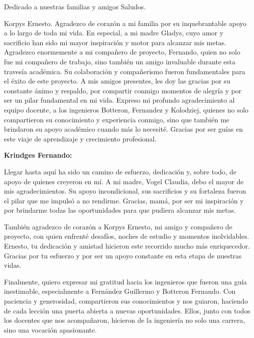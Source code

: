 

\begin{reconocimiento}{Dedicado a nuestras familias y amigos Saludos.}

Korpys Ernesto.
Agradezco de corazón a mi familia por su inquebrantable apoyo a lo largo de toda mi vida. En especial, a mi madre Gladys, cuyo amor y sacrificio han sido mi mayor inspiración y motor para alcanzar mis metas.
Agradezco enormemente a mi compañero de proyecto, Fernando, quien no solo fue mi compañero de trabajo, sino también un amigo invaluable durante esta travesía académica. Su colaboración y compañerismo fueron fundamentales para el éxito de este proyecto.
A mis amigos presentes, les doy las gracias por su constante ánimo y respaldo, por compartir conmigo momentos de alegría y por ser un pilar fundamental en mi vida.
Expreso mi profundo agradecimiento al equipo docente, a los ingenieros Botteron, Fernandez y Kolodziej, quienes no solo compartieron su conocimiento y experiencia conmigo, sino que también me brindaron su apoyo académico cuando más lo necesité. Gracias por ser guías en este viaje de aprendizaje y crecimiento profesional. \par 
\par 

\textbf{Krindges Fernando:} \par 
Llegar hasta aquí ha sido un camino de esfuerzo, dedicación y, sobre todo, de apoyo de quienes creyeron en mí. A mi madre, Vogel Claudia, debo el mayor de mis agradecimientos. Su apoyo incondicional, sus sacrificios y su fortaleza fueron el pilar que me impulsó a no rendirme. Gracias, mamá, por ser mi inspiración y por brindarme todas las oportunidades para que pudiera alcanzar mis metas.\par 

También agradezco de corazón a Korpys Ernesto, mi amigo y compañero de proyecto, con quien enfrenté desafíos, noches de estudio y momentos inolvidables. Ernesto, tu dedicación y amistad hicieron este recorrido mucho más enriquecedor. Gracias por tu esfuerzo y por ser un apoyo constante en esta etapa de nuestras vidas.\par 

Finalmente, quiero expresar mi gratitud hacia los ingenieros que fueron una guía inestimable, especialmente a Fernández Guillermo y Botteron Fernando. Con paciencia y generosidad, compartieron sus conocimientos y nos guiaron, haciendo de cada lección una puerta abierta a nuevas oportunidades. Ellos, junto con todos los docentes que nos acompañaron, hicieron de la ingeniería no solo una carrera, sino una vocación apasionante.\par 
\end{reconocimiento}